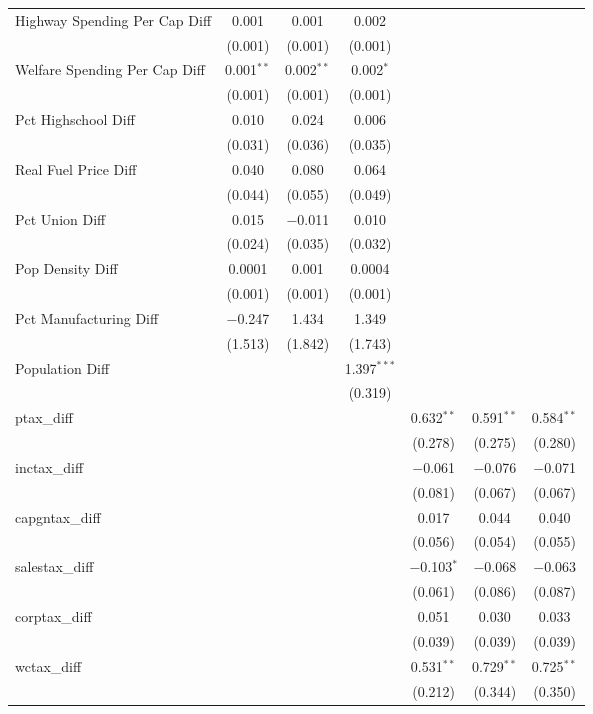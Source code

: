 \begin{table}[!htbp]
\begin{tabular}{@{\extracolsep{5pt}}lcccccc}
  Highway Spending Per Cap Diff & 0.001 & 0.001 & 0.002 &  &  &  \\ 
  & (0.001) & (0.001) & (0.001) &  &  &  \\ 
  Welfare Spending Per Cap Diff & 0.001$^{**}$ & 0.002$^{**}$ & 0.002$^{*}$ &  &  &  \\ 
  & (0.001) & (0.001) & (0.001) &  &  &  \\ 
  Pct Highschool Diff & 0.010 & 0.024 & 0.006 &  &  &  \\ 
  & (0.031) & (0.036) & (0.035) &  &  &  \\ 
  Real Fuel Price Diff & 0.040 & 0.080 & 0.064 &  &  &  \\ 
  & (0.044) & (0.055) & (0.049) &  &  &  \\ 
  Pct Union Diff & 0.015 & $-$0.011 & 0.010 &  &  &  \\ 
  & (0.024) & (0.035) & (0.032) &  &  &  \\ 
  Pop Density Diff & 0.0001 & 0.001 & 0.0004 &  &  &  \\ 
  & (0.001) & (0.001) & (0.001) &  &  &  \\ 
  Pct Manufacturing Diff & $-$0.247 & 1.434 & 1.349 &  &  &  \\ 
  & (1.513) & (1.842) & (1.743) &  &  &  \\ 
  Population Diff &  &  & 1.397$^{***}$ &  &  &  \\ 
  &  &  & (0.319) &  &  &  \\ 
  ptax\_diff &  &  &  & 0.632$^{**}$ & 0.591$^{**}$ & 0.584$^{**}$ \\ 
  &  &  &  & (0.278) & (0.275) & (0.280) \\ 
  inctax\_diff &  &  &  & $-$0.061 & $-$0.076 & $-$0.071 \\ 
  &  &  &  & (0.081) & (0.067) & (0.067) \\ 
  capgntax\_diff &  &  &  & 0.017 & 0.044 & 0.040 \\ 
  &  &  &  & (0.056) & (0.054) & (0.055) \\ 
  salestax\_diff &  &  &  & $-$0.103$^{*}$ & $-$0.068 & $-$0.063 \\ 
  &  &  &  & (0.061) & (0.086) & (0.087) \\ 
  corptax\_diff &  &  &  & 0.051 & 0.030 & 0.033 \\ 
  &  &  &  & (0.039) & (0.039) & (0.039) \\ 
  wctax\_diff &  &  &  & 0.531$^{**}$ & 0.729$^{**}$ & 0.725$^{**}$ \\ 
  &  &  &  & (0.212) & (0.344) & (0.350) \\ 

\end{tabular}
\end{table}
